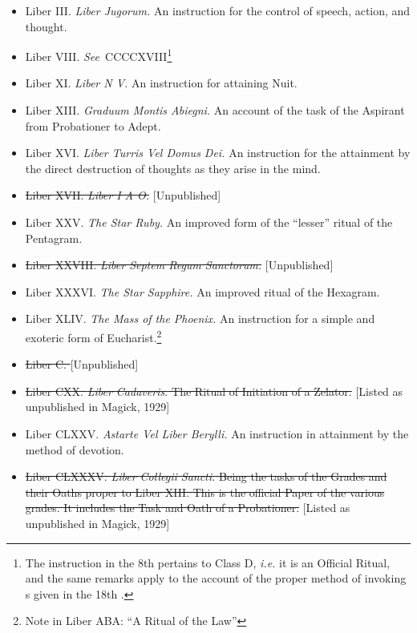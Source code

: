 \begin{itemize}
\item Liber III. \textemdash{} \textit{Liber Jugorum.} An instruction for the control of speech, action, and thought.
\item Liber VIII. \textit{See}{}\-\ CCCCXVIII\footnote{The instruction in the 8th \AEthyr{} pertains to Class D, \textit{i.e.} it is an Official Ritual, and the same remarks apply to the account of the proper method of invoking \AEthyr{}s given in the 18th \AEthyr.\footnotemark}
\item Liber XI. \textemdash{} \textit{Liber N V.} An instruction for attaining Nuit.
\item Liber XIII. \textemdash{} \textit{Graduum Montis Abiegni.} An account of the task of the Aspirant from Probationer to Adept.
\item Liber XVI. \textemdash{} \textit{Liber Turris Vel Domus Dei.} An instruction for the attainment by the direct destruction of thoughts as they arise in the mind.
\item \sout{Liber XVII. \textemdash{} \textit{Liber I A O.}} [Unpublished]
\item Liber XXV. \textemdash{} \textit{The Star Ruby.} An improved form of the \enquote{lesser} ritual of the Pentagram.
\item \sout{Liber XXVIII. \textemdash{} \textit{Liber Septem Regum Sanctorum.}} [Unpublished]
\item Liber XXXVI. \textemdash{} \textit{The Star Sapphire.} An improved ritual of the Hexagram.
\item Liber XLIV. \textemdash{} \textit{The Mass of the Phoenix.} An instruction for a simple and exoteric form of Eucharist.\footnote{Note in Liber ABA: \enquote{A Ritual of the Law}}
\item \sout{Liber C. \textemdash{} \textit{}} [Unpublished]
\item \sout{Liber CXX. \textemdash{} \textit{Liber Cadaveris.} The Ritual of Initiation of a Zelator.} [Listed as unpublished in Magick, 1929]
\item Liber CLXXV. \textemdash{} \textit{Astarte Vel Liber Berylli.} An instruction in attainment by the method of devotion.
\item \sout{Liber CLXXXV. \textemdash{} \textit{Liber Collegii Sancti.} Being the tasks of the Grades and their Oaths proper to Liber XIII. This is the official Paper of the various grades. It includes the Task and Oath of a Probationer.} [Listed as unpublished in Magick, 1929]

\end{itemize}
